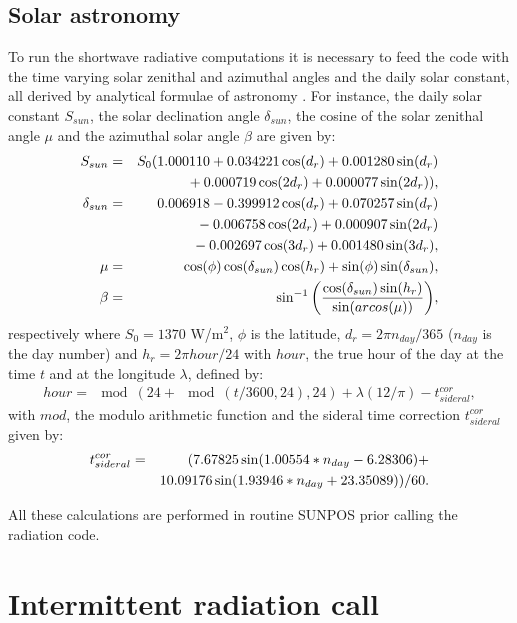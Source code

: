 \subsection{Solar astronomy}
To run the shortwave radiative computations it is necessary to feed the code
with the time varying solar zenithal and azimuthal angles and
the daily solar constant, all derived by analytical formulae of astronomy
\citep{Paltridge1976}.
For instance, the daily solar constant $S_{sun}$, the solar declination angle
$\delta_{sun}$, the cosine of the solar zenithal angle $\mu$ and the azimuthal
solar angle $\beta$ are given by:
\begin{eqnarray}
S_{sun} &=& S_0(1.000110+0.034221\cos(d_r)+0.001280\sin(d_r) \cr
        & &              \mbox{} +0.000719\cos(2d_r)+0.000077\sin(2d_r)), \\
\delta_{sun} &=& 0.006918-0.399912 \cos(d_r)+0.070257 \sin(d_r) \cr
             & &          \mbox{} -0.006758 \cos(2d_r)+0.000907 \sin(2d_r) \cr
             & &          \mbox{} -0.002697\cos(3d_r)+0.001480\sin(3d_r), \\
\mu &=& \cos(\phi)\cos(\delta_{sun})\cos(h_r)+\sin(\phi)\sin(\delta_{sun}), \\
\beta &=& \sin^{-1}\displaystyle{\biggl(
        \displaystyle{\cos(\delta_{sun}) \sin(h_r) \over \sin(arcos(\mu))}
                                \biggr)},
\end{eqnarray}
respectively where $S_0=1370$ W/m$^2$, $\phi$ is the latitude,
$d_r=2\pi n_{day}/365$ ($n_{day}$ is the day number) and
$h_r=2\pi {hour}/24$ with ${hour}$, the true hour of the day at the time $t$
and at the longitude $\lambda$, defined by:
\begin{eqnarray}
{hour} = \mod(24+\mod(t/3600,24),24) + \lambda (12/\pi) - t_{sideral}^{cor},
\end{eqnarray}
with $mod$, the modulo arithmetic function and the sideral time correction
$t_{sideral}^{cor}$ given by:
\begin{eqnarray}
t_{sideral}^{cor} &=& (7.67825 \sin(1.00554*n_{day}-6.28306) + \cr
        & &              \mbox{} 10.09176 \sin(1.93946*n_{day}+23.35089))/60.
\end{eqnarray}

\noindent All these calculations are performed in routine SUNPOS prior calling
the radiation code.

\section{Intermittent radiation call}

